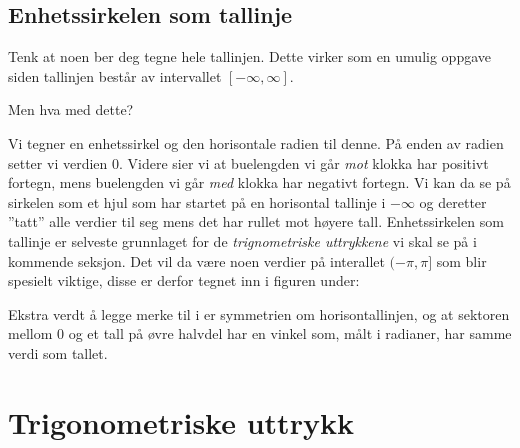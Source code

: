\subsection{Enhetssirkelen som tallinje}
Tenk at noen ber deg tegne hele tallinjen. Dette virker som en umulig oppgave siden tallinjen består av intervallet $ [-\infty, \infty] $. 

Men hva med dette?\regv

Vi tegner en enhetssirkel og den horisontale radien til denne. På enden av radien setter vi verdien 0. Videre sier vi at buelengden vi går \textit{mot} klokka har positivt fortegn, mens buelengden vi går \textit{med} klokka har negativt fortegn. 
Vi kan da se på sirkelen som et hjul som har startet på en horisontal tallinje i $ -\infty $ og deretter ''tatt'' alle verdier til seg mens det har rullet mot høyere tall.\vsk
{}
\newpage
Enhetssirkelen som tallinje er selveste grunnlaget for de \textit{trignometriske uttrykkene} vi skal se på i kommende seksjon. Det vil da være noen verdier på interallet $ (-\pi, \pi] $ som blir spesielt viktige, disse er derfor tegnet inn i figuren under:

\figc{unitcirc}{Intervallet  $ (-\pi, \pi] $ avbildet på enhetssirkelen.\label{enh}}

Ekstra verdt å legge merke til i  er symmetrien om horisontallinjen, og at sektoren mellom 0 og et tall på øvre halvdel har en vinkel som, målt i radianer, har samme verdi som tallet.
\section{Trigonometriske uttrykk}
